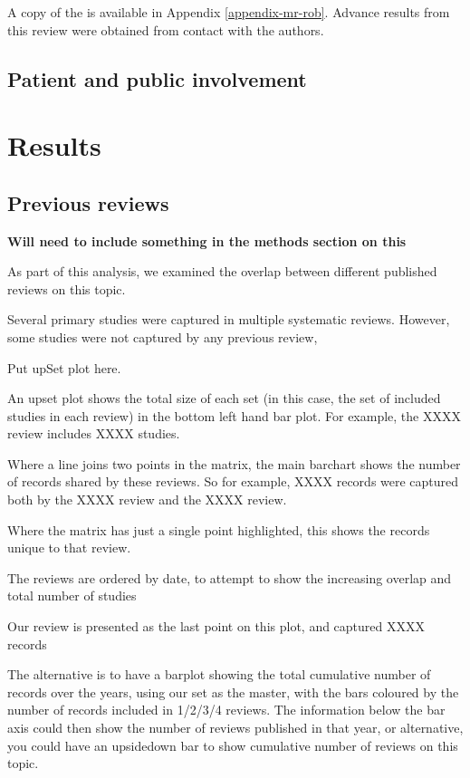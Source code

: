 \documentclass[a4paper, twoside]{templates/ociamthesis}
\begin{document}
A copy of the is available in Appendix \ref{appendix-mr-rob}. Advance results from this review were obtained from contact with the authors.

\hypertarget{patient-and-public-involvement}{%
\subsection{Patient and public involvement}\label{patient-and-public-involvement}}

\hypertarget{results}{%
\section{Results}\label{results}}

\hypertarget{previous-reviews}{%
\subsection{Previous reviews}\label{previous-reviews}}

\textbf{Will need to include something in the methods section on this}

As part of this analysis, we examined the overlap between different published reviews on this topic.

Several primary studies were captured in multiple systematic reviews. However, some studies were not captured by any previous review,

Put upSet plot here.

An upset plot shows the total size of each set (in this case, the set of included studies in each review) in the bottom left hand bar plot. For example, the XXXX review includes XXXX studies.

Where a line joins two points in the matrix, the main barchart shows the number of records shared by these reviews. So for example, XXXX records were captured both by the XXXX review and the XXXX review.

Where the matrix has just a single point highlighted, this shows the records unique to that review.

The reviews are ordered by date, to attempt to show the increasing overlap and total number of studies

Our review is presented as the last point on this plot, and captured XXXX records

The alternative is to have a barplot showing the total cumulative number of records over the years, using our set as the master, with the bars coloured by the number of records included in 1/2/3/4 reviews. The information below the bar axis could then show the number of reviews published in that year, or alternative, you could have an upsidedown bar to show cumulative number of reviews on this topic.
\end{document}
